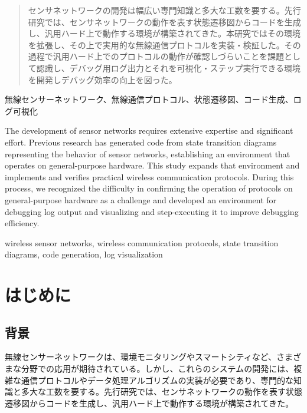 \documentclass[paper]{ieicej}
\begin{document}
\begin{abstract}
センサネットワークの開発は幅広い専門知識と多大な工数を要する。先行研究では、センサネットワークの動作を表す状態遷移図からコードを生成し、汎用ハード上で動作する環境が構築されてきた。本研究ではその環境を拡張し、その上で実用的な無線通信プロトコルを実装・検証した。その過程で汎用ハード上でのプロトコルの動作が確認しづらいことを課題として認識し、デバッグ用ログ出力とそれを可視化・ステップ実行できる環境を開発しデバッグ効率の向上を図った。
\end{abstract}
\begin{keyword}
無線センサーネットワーク、無線通信プロトコル、状態遷移図、コード生成、ログ可視化
\end{keyword}

\begin{eabstract}
The development of sensor networks requires extensive expertise and significant effort. Previous research has generated code from state transition diagrams representing the behavior of sensor networks, establishing an environment that operates on general-purpose hardware. This study expands that environment and implements and verifies practical wireless communication protocols. During this process, we recognized the difficulty in confirming the operation of protocols on general-purpose hardware as a challenge and developed an environment for debugging log output and visualizing and step-executing it to improve debugging efficiency.
\end{eabstract}

\begin{ekeyword}
wireless sensor networks, wireless communication protocols, state transition diagrams, code generation, log visualization
\end{ekeyword}
\maketitle

\section{はじめに}
\subsection{背景}
無線センサーネットワークは、環境モニタリングやスマートシティなど、さまざまな分野での応用が期待されている。しかし、これらのシステムの開発には、複雑な通信プロトコルやデータ処理アルゴリズムの実装が必要であり、専門的な知識と多大な工数を要する。先行研究では、センサネットワークの動作を表す状態遷移図からコードを生成し、汎用ハード上で動作する環境が構築されてきた。
\end{document}
